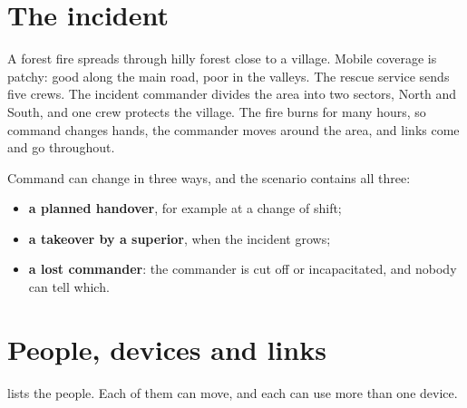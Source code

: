\documentclass[11pt,a4paper]{article}
\begin{document}
\section{The incident}
\label{sec:incident}

A forest fire spreads through hilly forest close to a village. Mobile coverage is patchy:
good along the main road, poor in the valleys. The rescue service sends five crews. The
incident commander divides the area into two sectors, North and South, and one crew
protects the village. The fire burns for many hours, so command changes hands, the
commander moves around the area, and links come and go throughout.

Command can change in three ways, and the scenario contains all three:
\begin{itemize}
  \item \textbf{a planned handover}, for example at a change of shift;
  \item \textbf{a takeover by a superior}, when the incident grows;
  \item \textbf{a lost commander}: the commander is cut off or incapacitated, and nobody can
        tell which.
\end{itemize}

\section{People, devices and links}
\label{sec:people}

 lists the people. Each of them can move, and each can use more than one
device.
\end{document}
